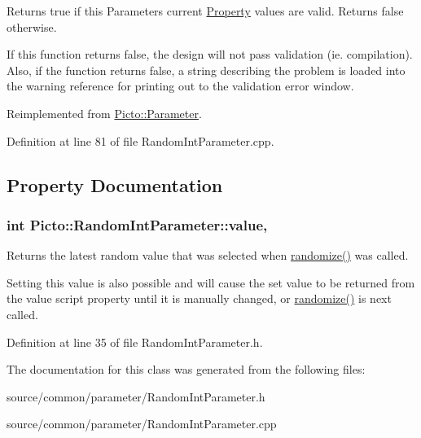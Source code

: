Returns true if this Parameters current \hyperlink{class_picto_1_1_property}{Property} values are valid. Returns false otherwise. 

If this function returns false, the design will not pass validation (ie. compilation). Also, if the function returns false, a string describing the problem is loaded into the warning reference for printing out to the validation error window. 

Reimplemented from \hyperlink{class_picto_1_1_parameter_a3443808da4c3edf26f2c3c3772d95b10}{Picto\-::\-Parameter}.



Definition at line 81 of file Random\-Int\-Parameter.\-cpp.



\subsection{Property Documentation}
\hypertarget{class_picto_1_1_random_int_parameter_a59a557ac3a0881578fd4a60745cbb280}{
\subsubsection[{value}]{\setlength{\rightskip}{0pt plus 5cm}int Picto\-::\-Random\-Int\-Parameter\-::value\hspace{0.3cm}{\ttfamily [read]}, {\ttfamily [write]}}}\label{class_picto_1_1_random_int_parameter_a59a557ac3a0881578fd4a60745cbb280}


Returns the latest random value that was selected when \hyperlink{class_picto_1_1_random_int_parameter_a2995dcbd9542ebeb1e880c573125a962}{randomize()} was called. 

Setting this value is also possible and will cause the set value to be returned from the value script property until it is manually changed, or \hyperlink{class_picto_1_1_random_int_parameter_a2995dcbd9542ebeb1e880c573125a962}{randomize()} is next called. 

Definition at line 35 of file Random\-Int\-Parameter.\-h.



The documentation for this class was generated from the following files\-:\begin{DoxyCompactItemize}
\item 
source/common/parameter/Random\-Int\-Parameter.\-h\item 
source/common/parameter/Random\-Int\-Parameter.\-cpp\end{DoxyCompactItemize}
